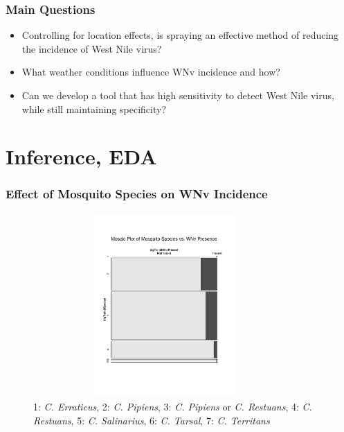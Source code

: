 \documentclass[handout]{beamer}
\begin{document}
\begin{frame}
\frametitle{Main Questions}
    \begin{itemize}
	\item Controlling for location effects, is spraying an effective method of reducing the incidence of West Nile virus?
	\item What weather conditions influence WNv incidence and how?
	\item Can we develop a tool that has high sensitivity to detect West Nile virus, while still maintaining specificity?
    \end{itemize}
\end{frame}

\section{Inference, EDA}
\begin{frame}
\frametitle{Effect of Mosquito Species on WNv Incidence}
\begin{figure}[H]
\caption{1: \emph{C. Erraticus}, 2: \emph{C. Pipiens}, 3: \emph{C. Pipiens} or \emph{C. Restuans}, 4: \emph{C. Restuans}, 5: \emph{C. Salinarius}, 6: \emph{C. Tarsal}, 7: \emph{C. Territans}}
\includegraphics[height=7cm, width=10cm]{Mosaic_SpeciesVSWNv.pdf}
\end{figure}
\end{frame}
\end{document}

